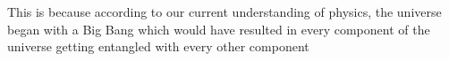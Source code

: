 This is because according to our current understanding of physics, the universe began with a Big Bang which would have resulted in every component of the universe getting entangled with every other component